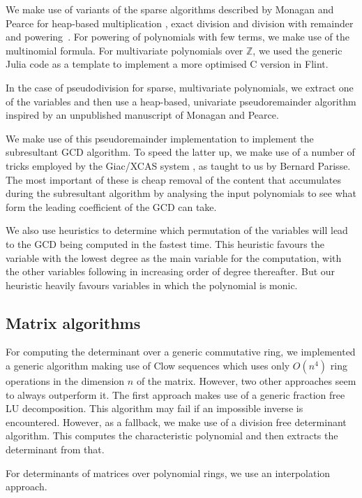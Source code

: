 \documentclass{sig-alternate-05-2015}
\begin{document}
We make use of variants of the sparse algorithms described by Monagan and
Pearce for heap-based multiplication \cite{heapmul}, exact division and division with
remainder \cite{heapdiv} and powering~\cite{heappow}. For powering of polynomials with
few terms, we make use of the multinomial formula.
For multivariate polynomials over $\mathbb{Z}$, we used the generic Julia
code as a template to implement a more optimised C version in Flint.

In the case of pseudodivision for sparse, multivariate polynomials, we extract one
of the variables and then use a heap-based, univariate pseudoremainder
algorithm inspired by an unpublished manuscript of Monagan and Pearce.

We make use of this pseudoremainder implementation to implement the subresultant
GCD algorithm. To speed the latter up, we make use of a number of tricks employed by the
Giac/XCAS system \cite{giac}, as taught to us by Bernard Parisse. The most important
of these is cheap removal of the content that accumulates during the subresultant
algorithm by analysing the input polynomials to see what form the leading coefficient
of the GCD can take.

We also use heuristics to determine which permutation of the variables will lead to
the GCD being computed in the fastest time. This heuristic favours the variable with
the lowest degree as the main variable for the computation, with the other variables 
following in increasing order of degree thereafter. But our heuristic heavily favours
variables in which the polynomial is monic.

\subsection{Matrix algorithms}

For computing the determinant over a generic commutative ring, we implemented a generic
algorithm making use of Clow sequences \cite{clow} which uses only $O(n^4)$ ring operations
in the dimension $n$ of the matrix. However, two other approaches seem to always outperform
it. The first approach makes use of a generic fraction free LU decomposition. This algorithm
may fail if an impossible inverse is encountered. However, as a fallback, we make use of a
division free determinant algorithm. This computes the characteristic polynomial and then
extracts the determinant from that.

For determinants of matrices over polynomial rings, we use an interpolation approach.
\end{document}
